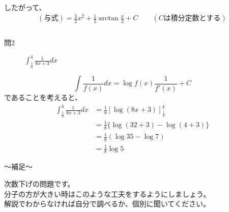 \documentclass[dvipdfmx,uplatex]{jsarticle}
\begin{document}
したがって、\\
\begin{align*}
    (与式) = \frac{3}{2}x ^ 2 + \frac{1}{2}\arctan\frac{x}{2} + C \qquad (Cは積分定数とする) \\\\
\end{align*}

\begin{description}
    \item [問2] $ \displaystyle \int_\frac{1}{2}^4 \frac{1}{8x+3} dx $
\end{description}
\begin{equation*}
  \int \frac{1}{f(x)} dx = \log{f(x)}\frac{1}{f'(x)} + C
\end{equation*}
であることを考えると、
\begin{align*}
    \int_\frac{1}{2}^4  \frac{1}{8x+3} dx
    &= \frac{1}{8}\left[\log(8x+3)\right]_\frac{1}{2}^4 \\
    &= \frac{1}{8}\{\log(32+3)-\log(4+3)\} \\
    &= \frac{1}{8}(\log35 - \log7) \\
    &= \frac{1}{8}\log5
\end{align*}

\begin{boxnote}
    〜補足〜
    \begin{center}
        次数下げの問題です。\\
        分子の方が大きい時はこのような工夫をするようにしましょう。 \\
        解説でわからなければ自分で調べるか、個別に聞いてください。
    \end{center}
\end{boxnote}
\end{document}
